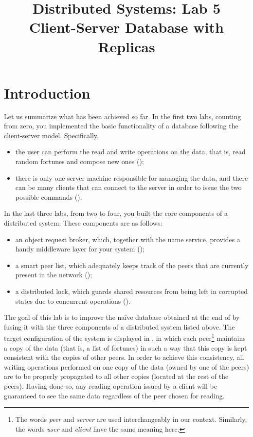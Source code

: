 \documentclass[a4paper]{article}
\title{%
  Distributed Systems: Lab 5\\%
  Client-Server Database with Replicas%
}
\author{}
\date{}
\begin{document}
\maketitle

\section{Introduction}

Let us summarize what has been achieved so far. In the first two labs, counting
from zero, you implemented the basic functionality of a database following the
client-server model. Specifically,
\begin{itemize}

  \item the user can perform the read and write operations on the data, that is,
  read random fortunes and compose new ones ();

  \item there is only one server machine responsible for managing the data, and
  there can be many clients that can connect to the server in order to issue the
  two possible commands ().

\end{itemize}
In the last three labs, from two to four, you built the core components of a
distributed system. These components are as follows:
\begin{itemize}

  \item an object request broker, which, together with the name service,
  provides a handy middleware layer for your system ();

  \item a smart peer list, which adequately keeps track of the peers that are
  currently present in the network ();

  \item a distributed lock, which guards shared resources from being left in
  corrupted states due to concurrent operations ().

\end{itemize}
The goal of this lab is to improve the na\"{i}ve database obtained at the end of
 by fusing it with the three components of a distributed system listed
above. The target configuration of the system is displayed in
, in which each peer\footnote{The words \emph{peer}
and \emph{server} are used interchangeably in our context. Similarly, the words
\emph{user} and \emph{client} have the same meaning here.} maintains a copy of
the data (that is, a list of fortunes) in such a way that this copy is kept
consistent with the copies of other peers. In order to achieve this consistency,
all writing operations performed on one copy of the data (owned by one of the
peers) are to be properly propagated to all other copies (located at the rest of
the peers). Having done so, any reading operation issued by a client will be
guaranteed to see the same data regardless of the peer chosen for reading.
\end{document}
